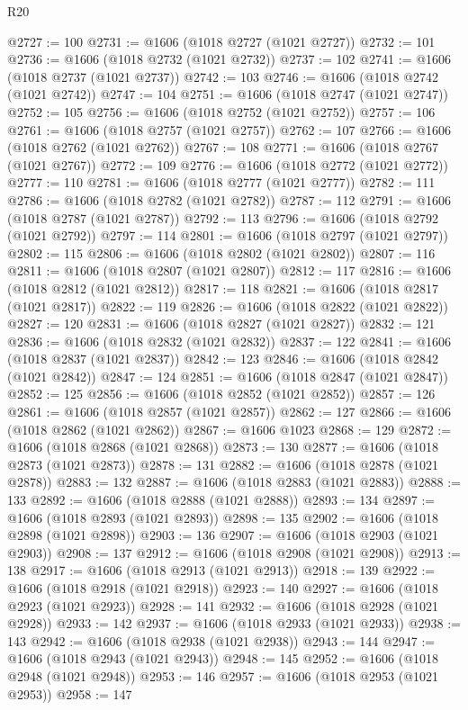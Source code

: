 \begin{lexlean}{R20}
\begin{coremodule}
@2727 := 100
@2731 := @1606 (@1018 @2727 (@1021 @2727))
@2732 := 101
@2736 := @1606 (@1018 @2732 (@1021 @2732))
@2737 := 102
@2741 := @1606 (@1018 @2737 (@1021 @2737))
@2742 := 103
@2746 := @1606 (@1018 @2742 (@1021 @2742))
@2747 := 104
@2751 := @1606 (@1018 @2747 (@1021 @2747))
@2752 := 105
@2756 := @1606 (@1018 @2752 (@1021 @2752))
@2757 := 106
@2761 := @1606 (@1018 @2757 (@1021 @2757))
@2762 := 107
@2766 := @1606 (@1018 @2762 (@1021 @2762))
@2767 := 108
@2771 := @1606 (@1018 @2767 (@1021 @2767))
@2772 := 109
@2776 := @1606 (@1018 @2772 (@1021 @2772))
@2777 := 110
@2781 := @1606 (@1018 @2777 (@1021 @2777))
@2782 := 111
@2786 := @1606 (@1018 @2782 (@1021 @2782))
@2787 := 112
@2791 := @1606 (@1018 @2787 (@1021 @2787))
@2792 := 113
@2796 := @1606 (@1018 @2792 (@1021 @2792))
@2797 := 114
@2801 := @1606 (@1018 @2797 (@1021 @2797))
@2802 := 115
@2806 := @1606 (@1018 @2802 (@1021 @2802))
@2807 := 116
@2811 := @1606 (@1018 @2807 (@1021 @2807))
@2812 := 117
@2816 := @1606 (@1018 @2812 (@1021 @2812))
@2817 := 118
@2821 := @1606 (@1018 @2817 (@1021 @2817))
@2822 := 119
@2826 := @1606 (@1018 @2822 (@1021 @2822))
@2827 := 120
@2831 := @1606 (@1018 @2827 (@1021 @2827))
@2832 := 121
@2836 := @1606 (@1018 @2832 (@1021 @2832))
@2837 := 122
@2841 := @1606 (@1018 @2837 (@1021 @2837))
@2842 := 123
@2846 := @1606 (@1018 @2842 (@1021 @2842))
@2847 := 124
@2851 := @1606 (@1018 @2847 (@1021 @2847))
@2852 := 125
@2856 := @1606 (@1018 @2852 (@1021 @2852))
@2857 := 126
@2861 := @1606 (@1018 @2857 (@1021 @2857))
@2862 := 127
@2866 := @1606 (@1018 @2862 (@1021 @2862))
@2867 := @1606 @1023
@2868 := 129
@2872 := @1606 (@1018 @2868 (@1021 @2868))
@2873 := 130
@2877 := @1606 (@1018 @2873 (@1021 @2873))
@2878 := 131
@2882 := @1606 (@1018 @2878 (@1021 @2878))
@2883 := 132
@2887 := @1606 (@1018 @2883 (@1021 @2883))
@2888 := 133
@2892 := @1606 (@1018 @2888 (@1021 @2888))
@2893 := 134
@2897 := @1606 (@1018 @2893 (@1021 @2893))
@2898 := 135
@2902 := @1606 (@1018 @2898 (@1021 @2898))
@2903 := 136
@2907 := @1606 (@1018 @2903 (@1021 @2903))
@2908 := 137
@2912 := @1606 (@1018 @2908 (@1021 @2908))
@2913 := 138
@2917 := @1606 (@1018 @2913 (@1021 @2913))
@2918 := 139
@2922 := @1606 (@1018 @2918 (@1021 @2918))
@2923 := 140
@2927 := @1606 (@1018 @2923 (@1021 @2923))
@2928 := 141
@2932 := @1606 (@1018 @2928 (@1021 @2928))
@2933 := 142
@2937 := @1606 (@1018 @2933 (@1021 @2933))
@2938 := 143
@2942 := @1606 (@1018 @2938 (@1021 @2938))
@2943 := 144
@2947 := @1606 (@1018 @2943 (@1021 @2943))
@2948 := 145
@2952 := @1606 (@1018 @2948 (@1021 @2948))
@2953 := 146
@2957 := @1606 (@1018 @2953 (@1021 @2953))
@2958 := 147

\end{coremodule}
\end{lexlean}
